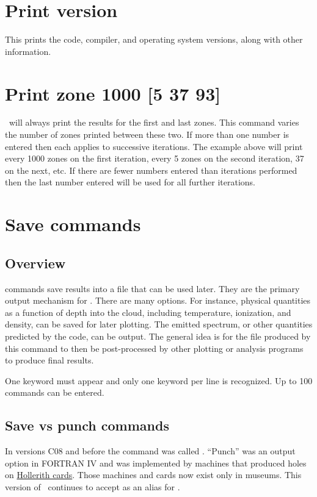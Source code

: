 \section{Print version}

This prints the code, compiler, and operating system versions, along
with other information.

\section{Print zone 1000 [5 37 93]}

\Cloudy\ will always print the results for the first and last zones.  This
command varies the number of zones printed between these two.
If more than
one number is entered then each applies to successive iterations.  The
example above will print every 1000 zones on the first iteration, every
5 zones on the second iteration, 37 on the next, etc.  If there are fewer
numbers entered than iterations performed then the last number entered will
be used for all further iterations.

\section{Save commands}

\subsection{Overview}

 commands save results into a file that can be used later.
They
are the primary output mechanism for \Cloudy.
There are many options.
For
instance, physical quantities as a function of depth into the cloud,
including temperature, ionization, and density, can be saved for later
plotting.
The emitted spectrum, or other quantities predicted by the code,
can be output.
The general idea is for the file produced by this command to then
be post-processed by other plotting or analysis programs to produce final
results.

One keyword must appear and only one keyword per line is recognized.
Up to 100  commands can be entered.

\subsection{Save vs punch commands}
In versions C08 and before the  command was
called .
``Punch'' was an output option in FORTRAN IV and was implemented by 
machines that produced holes on 
\href{http://en.wikipedia.org/wiki/Punched_card}{Hollerith cards}.
Those machines and cards now exist only in museums. 
This version of \Cloudy\ continues to accept
 as an alias for .

